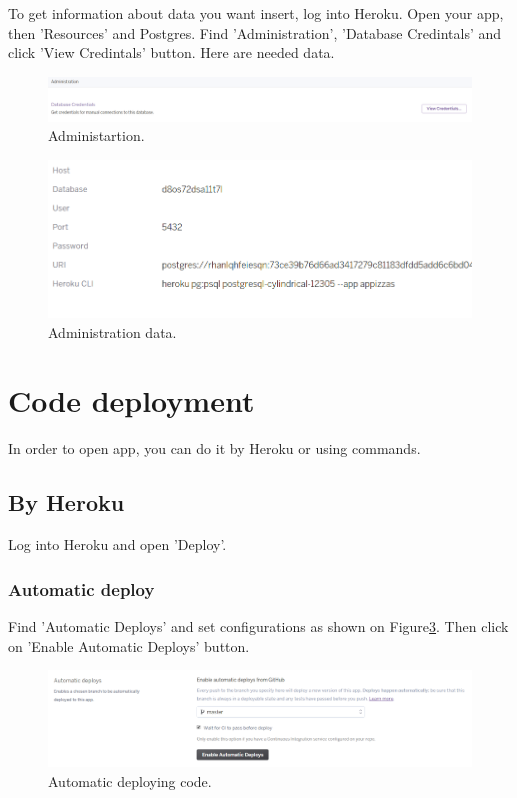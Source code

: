\documentclass[12pt,a4paper]{article}
\begin{document}
To get information about data you want insert, log into Heroku. Open your app, then 'Resources' and Postgres. Find 'Administration', 'Database Credintals' and click 'View Credintals' button. Here are needed data.

\begin{figure}[H]
	\centering
	\includegraphics[width=1\textwidth]{images/admin.PNG}
	\caption{Administartion.}
	\label{fig:ad}
\end{figure}

\begin{figure}[H]
	\centering
	\includegraphics[width=1\textwidth]{images/datas.PNG}
	\caption{Administration data.}
	\label{fig:da}
\end{figure}


\section{Code deployment}
In order to open app, you can do it by Heroku or using commands. \\
\subsection{By Heroku}
Log into Heroku and open 'Deploy'.

\subsubsection{Automatic deploy}
 Find 'Automatic Deploys' and set configurations as shown on Figure\ref{fig:dep}. Then click on 'Enable Automatic Deploys' button.

\begin{figure}[H]
	\centering
	\includegraphics[width=1\textwidth]{images/deploy.PNG}
	\caption{Automatic deploying code.}
	\label{fig:dep}
\end{figure}
\end{document}
